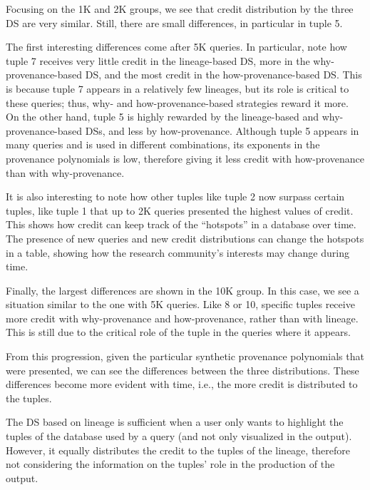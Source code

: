 Focusing on the 1K and 2K groups, we see that credit distribution by the three DS are very similar. Still, there are small differences, in particular in tuple 5.


The first interesting differences come after 5K queries. In particular, note how tuple 7 receives very little credit in the lineage-based DS, more in the why-provenance-based DS, and the most credit in the how-provenance-based DS. This is because tuple 7 appears in a relatively few lineages, but its role is critical to these queries; thus, why- and how-provenance-based strategies reward it more.
On the other hand, tuple 5 is highly rewarded by the lineage-based and why-provenance-based DSs, and less by how-provenance. Although tuple 5 appears in many queries and is used in different combinations, its exponents in the provenance polynomials is low, therefore giving it less credit with how-provenance than with why-provenance.

It is also interesting to note how other tuples like tuple 2 now surpass certain tuples, like tuple 1 that up to 2K queries presented the highest values of credit. This shows how credit can keep track of the ``hotspots'' in a database over time. The presence of new queries and new credit distributions can change the hotspots in a table, showing how the research community's interests may change during time. 

Finally, the largest differences are shown in the 10K group. In this case, we see a situation similar to the one with 5K queries. Like 8 or 10, specific tuples receive more credit with why-provenance and how-provenance, rather than with lineage. This is still due to the critical role of the tuple in the queries where it appears. 

From this progression, given the particular synthetic provenance polynomials that were presented, we can see the differences between the three distributions. These differences become more evident with time, i.e., the more credit is distributed to the tuples. 

The DS based on lineage is sufficient when a user only wants to highlight the tuples of the database used by a query (and not only visualized in the output). However, it equally distributes the credit to the tuples of the lineage, therefore not considering the information on the tuples' role in the production of the output. 

